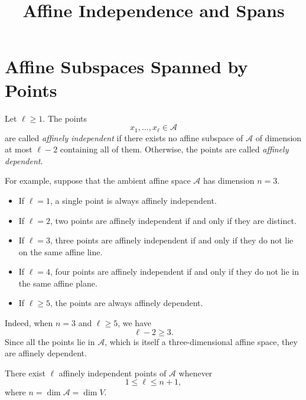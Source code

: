 \documentclass[12pt]{article}
\title{Affine Independence and Spans}
\author{}
\date{}
\begin{document}
\maketitle

\section{Affine Subspaces Spanned by Points}

\begin{definition}
Let \(\ell\geq 1\). The points
\[
x_1,\ldots,x_\ell\in \mathcal A
\]
are called \emph{affinely independent} if there exists no affine
subspace of \(\mathcal A\) of dimension at most \(\ell-2\) containing all of them.
Otherwise, the points are called \emph{affinely dependent}.
\end{definition}

For example, suppose that the ambient affine space \(\mathcal A\) has dimension
\(n=3\).

\begin{itemize}
    \item If \(\ell=1\), a single point is always affinely independent.

    \item If \(\ell=2\), two points are affinely independent if and only if
    they are distinct.

    \item If \(\ell=3\), three points are affinely independent if and only if
    they do not lie on the same affine line.

    \item If \(\ell=4\), four points are affinely independent if and only if
    they do not lie in the same affine plane.

    \item If \(\ell\geq 5\), the points are always affinely dependent.
\end{itemize}

Indeed, when \(n=3\) and \(\ell\geq5\), we have
\[
\ell-2\geq3.
\]
Since all the points lie in \(\mathcal A\), which is itself a
three-dimensional affine space, they are affinely dependent.

\begin{proposition}
There exist \(\ell\) affinely independent points of \(\mathcal A\) whenever
\[
1\leq \ell\leq n+1,
\]
where \(n=\dim \mathcal A=\dim V\).
\end{proposition}
\end{document}
